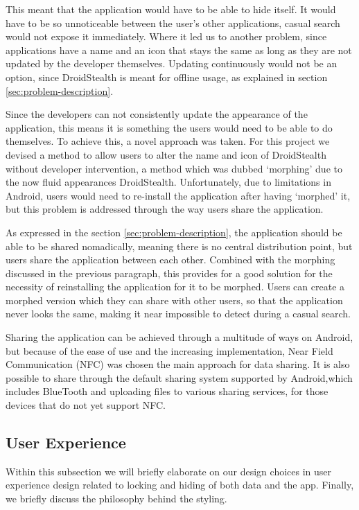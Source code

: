 This meant that the application would have to be able to hide itself.
It would have to be so unnoticeable between the user's other applications, casual search would not expose it immediately. 
Where it led us to another problem, since applications have a name and an icon that stays the same as long as they are not updated by the developer themselves.
Updating continuously would not be an option, since DroidStealth is meant for offline usage, as explained in section \ref{sec:problem-description}. 

Since the developers can not consistently update the appearance of the application, this means it is something the users would need to be able to do themselves.
To achieve this, a novel approach was taken.
For this project we devised a method to allow users to alter the name and icon of DroidStealth without developer intervention, a method which was dubbed `morphing' due to the now fluid appearances DroidStealth.
Unfortunately, due to limitations in Android, users would need to re-install the application after having `morphed' it, but this problem is addressed through the way users share the application.

As expressed in the section \ref{sec:problem-description}, the application should be able to be shared nomadically, meaning there is no central distribution point, but users share the application between each other. 
Combined with the morphing discussed in the previous paragraph, this provides for a good solution for the necessity of reinstalling the application for it to be morphed.
Users can create a morphed version which they can share with other users, so that the application never looks the same, making it near impossible to detect during a casual search.

Sharing the application can be achieved through a multitude of ways on Android, but because of the ease of use and the increasing implementation, Near Field Communication (NFC)\cite{website:nfc-spec} was chosen the main approach for data sharing. 
It is also possible to share through the default sharing system supported by Android,which includes BlueTooth and uploading files to various sharing services, for those devices that do not yet support NFC.

\subsection{User Experience}
\label{sec:approach-and-design:user-experience}

Within this subsection we will briefly elaborate on our design
choices in user experience design related to locking and hiding
of both data and the app. Finally, we briefly discuss the 
philosophy behind the styling. 

